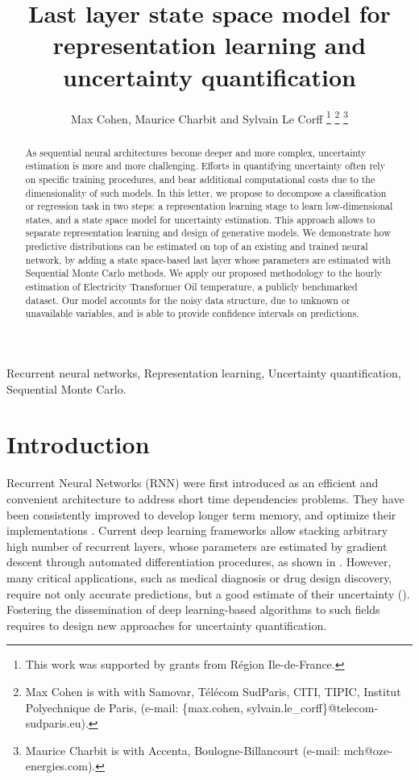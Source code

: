 \documentclass[journal]{IEEEtran}
\title{Last layer state space model for representation learning and uncertainty quantification}
\author{Max Cohen, Maurice Charbit and Sylvain Le Corff
	\thanks{This work was supported by grants from Région Ile-de-France.}
	\thanks{Max Cohen is with with Samovar, T\'el\'ecom SudParis, CITI, TIPIC, Institut Polyechnique de Paris, (e-mail: \{max.cohen, sylvain.le\_corff\}@telecom-sudparis.eu).}
	\thanks{Maurice Charbit is with Accenta, Boulogne-Billancourt (e-mail: mch@oze-energies.com).}}
\begin{document}
\maketitle
\begin{abstract}
	As sequential neural architectures become deeper and more complex, uncertainty estimation is more and more challenging.
	Efforts in quantifying uncertainty often rely on specific training procedures, and bear additional computational costs due to the dimensionality of such models.
	In this letter, we propose to decompose a classification or regression task in two steps: a representation learning stage to learn low-dimensional states, and a state space model for uncertainty estimation.
	This approach allows to separate representation learning and design of generative models.
	We demonstrate how predictive distributions can be estimated on top of an existing and trained neural network, by adding a state space-based last layer whose parameters are estimated with Sequential Monte Carlo methods.
	We apply our proposed methodology to the hourly estimation of Electricity Transformer Oil temperature, a publicly benchmarked dataset.
	Our model accounts for the noisy data structure, due to unknown or unavailable variables, and is able to provide confidence intervals on predictions.
\end{abstract}

\begin{IEEEkeywords}
	Recurrent neural networks, Representation learning, Uncertainty quantification, Sequential Monte Carlo.
\end{IEEEkeywords}

\section{Introduction}
\label{sec:intro}

Recurrent Neural Networks (RNN) were first introduced as an efficient and convenient architecture to address short time dependencies problems.
They have been consistently improved to develop longer term memory, and optimize their implementations \cite{Bengio1994LearningLD,Hochreiter1997LongSM}. %
Current deep learning frameworks allow stacking arbitrary high number of recurrent layers, whose parameters are estimated by gradient descent through automated differentiation procedures, as shown in \cite{Graves2013SpeechRecognition}.
However, many critical applications, such as medical diagnosis or drug design discovery, require not only accurate predictions, but a good estimate of their uncertainty (\cite{Crowson2016AssessingCalibration, Mervin2020UncertaintyQuantification}).
Fostering the dissemination of deep learning-based algorithms to such fields requires to design new approaches for uncertainty quantification.
\end{document}
